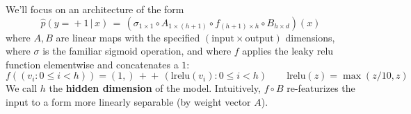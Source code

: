   We'll focus on an architecture of the form
  $$
    \hat p(y\!=\!+1\,|\,x) \,=\,
    (\sigma_{1\times 1} \circ
    A_{1\times (h+1)} \circ
    f_{(h+1)\times h} \circ
    B_{h\times d})(x)
  $$
  where $A,B$ are linear maps with the specified
  $(\text{input}\times\text{output})$ dimensions, where $\sigma$ is the
  familiar sigmoid operation, and where $f$ applies the leaky relu
  function elementwise and concatenates a $1$:
  $$
    f((v_i : 0\leq i<h)) = (1,)\,+\!\!\!\!+\,(\text{lrelu}(v_i) : 0\leq i<h)
    \quad \quad
    \text{lrelu}(z) = \max(z/10, z)
  $$
  We call $h$ the \textbf{hidden dimension} of the model.
  Intuitively, $f \circ B$ re-featurizes the input to a form more
  linearly separable (by weight vector $A$).



